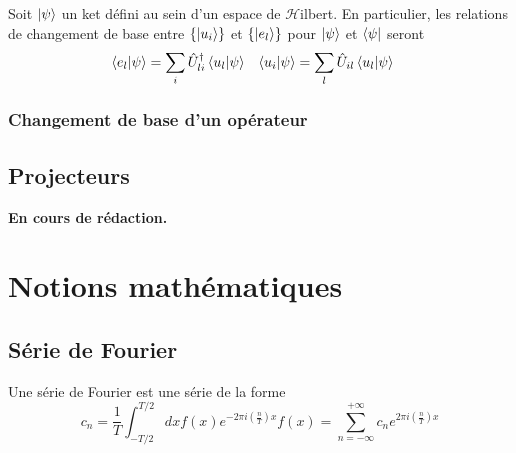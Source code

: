\documentclass[../notesdecours.tex]{subfiles}
\begin{document}
\begin{Property}
	Soit $\ket{\psi}$ un ket défini au sein d'un espace de $\mathcal{H}$ilbert. En particulier, les relations de changement de base entre $\left\{\ket{u_i}\right\}$ et $\left\{\ket{e_l}\right\}$ pour $\ket{\psi}$ et $\bra{\psi}$ seront
	\begin{align}
		\braket{e_l|\psi} &= \sum_i \hat{U}^\dagger_{li} \braket{u_l|\psi} & \braket{u_i|\psi} &= \sum_l \hat{U}_{il} \braket{u_l|\psi} 
	\end{align}
\end{Property}

\subsection{Changement de base d'un opérateur}

\section{Projecteurs}
{\color{blue} \textbf{En cours de rédaction.}}

\chapter{Notions mathématiques}
\section{Série de Fourier}
Une série de Fourier est une série de la forme
\begin{subequations}
\begin{equation}
c_n = \frac{1}{T} \int^{T/2}_{-T/2} dx f(x)e^{-2\pi i(\frac{n}{T})x}
\end{equation}
\begin{equation}
f(x) = \sum_{n = -\infty}^{+\infty}c_ne^{2\pi i (\frac{n}{T})x}
\end{equation}
\end{subequations}
\end{document}
